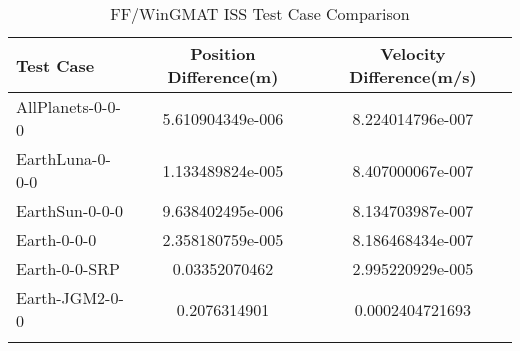 \begin{table}[htbp!]
\centering
\caption{ FF/WinGMAT ISS Test Case Comparison}
      \begin{tabular}{lcc}
      \hline\hline
          Test Case & Position Difference(m) & Velocity Difference(m/s) \\
         \hline
         AllPlanets-0-0-0 & 5.610904349e-006 & 8.224014796e-007 \\
         EarthLuna-0-0-0 & 1.133489824e-005 & 8.407000067e-007 \\
         EarthSun-0-0-0 & 9.638402495e-006 & 8.134703987e-007 \\
         Earth-0-0-0 & 2.358180759e-005 & 8.186468434e-007 \\
         Earth-0-0-SRP & 0.03352070462 & 2.995220929e-005 \\
         Earth-JGM2-0-0 & 0.2076314901 & 0.0002404721693 \\
      \hline\hline
      \label{Table: ISS FF-WinGMAT Table} 
\end{tabular}
\end{table}
